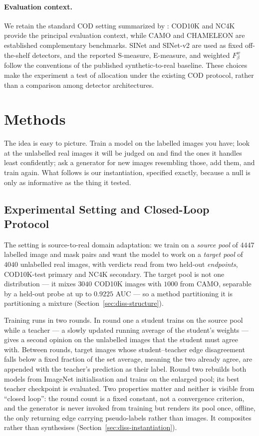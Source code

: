 \documentclass{article} %
\begin{document}
\paragraph{Evaluation context.}
We retain the standard COD setting summarized by \citet{fan2023advances}: COD10K and NC4K provide
the principal evaluation context, while CAMO and CHAMELEON are established complementary
benchmarks. SINet and SINet-v2 are used as fixed off-the-shelf detectors, and the reported
S-measure, E-measure, and weighted $F_\beta^w$ follow the conventions of the published synthetic-to-real
baseline. These choices make the experiment a test of allocation under the existing COD protocol,
rather than a comparison among detector architectures.

\section{Methods}
\label{sec:method}

The idea is easy to picture. Train a model on the labelled images you have; look at the unlabelled
real images it will be judged on and find the ones it handles least confidently; ask a generator for
new images resembling those, add them, and train again. What follows is our instantiation, specified
exactly, because a null is only as informative as the thing it tested.

\subsection{Experimental Setting and Closed-Loop Protocol}
\label{sec:method-setting}

The setting is source-to-real domain adaptation: we train on a \emph{source pool} of $4447$ labelled
image and mask pairs and want the model to work on a \emph{target pool} of $4040$ unlabelled real
images, with verdicts read from two held-out \emph{endpoints}, COD10K-test primary and NC4K
secondary. The target pool is not one distribution --- it mixes $3040$ COD10K images with $1000$ from
CAMO, separable by a held-out probe at up to $0.9225$ AUC --- so a method partitioning it is
partitioning a mixture (Section~\ref{sec:diss-structure}).

Training runs in two rounds. In round one a student trains on the source pool while a teacher --- a
slowly updated running average of the student's weights --- gives a second opinion on the unlabelled
images that the student must agree with. Between rounds, target images whose student--teacher edge
disagreement falls below a fixed fraction of the set average, meaning the two already agree, are
appended with the teacher's prediction as their label. Round two rebuilds both models from ImageNet
initialisation and trains on the enlarged pool; its best teacher checkpoint is evaluated. Two properties matter and neither is visible from ``closed loop'': the round count is a
fixed constant, not a convergence criterion, and the generator is never invoked from training but
renders its pool once, offline, the only returning edge carrying pseudo-labels rather than images.
It composites rather than synthesises
(Section~\ref{sec:diss-instantiation}).
\end{document}
